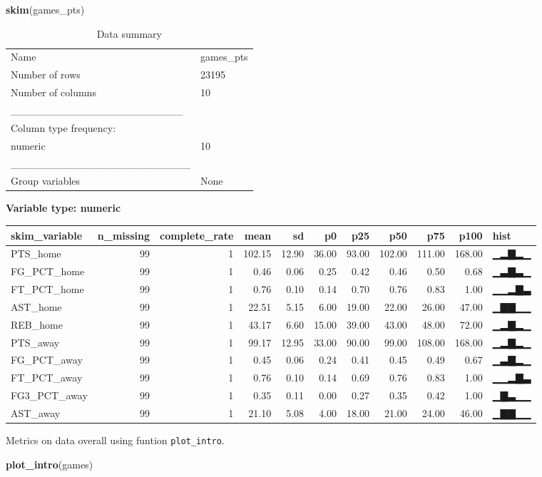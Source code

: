\documentclass[
]{article}
\newenvironment{Shaded}{\begin{snugshade}}{\end{snugshade}}
\newcommand{\KeywordTok}[1]{\textcolor[rgb]{0.13,0.29,0.53}{\textbf{#1}}}
\newcommand{\NormalTok}[1]{#1}
\begin{document}
\begin{Shaded}
\begin{Highlighting}[]
\KeywordTok{skim}\NormalTok{(games\_pts)}
\end{Highlighting}
\end{Shaded}

\begin{longtable}[]{@{}ll@{}}
\caption{Data summary}\tabularnewline
\toprule
\endhead
Name & games\_pts\tabularnewline
Number of rows & 23195\tabularnewline
Number of columns & 10\tabularnewline
\_\_\_\_\_\_\_\_\_\_\_\_\_\_\_\_\_\_\_\_\_\_\_ &\tabularnewline
Column type frequency: &\tabularnewline
numeric & 10\tabularnewline
\_\_\_\_\_\_\_\_\_\_\_\_\_\_\_\_\_\_\_\_\_\_\_\_ &\tabularnewline
Group variables & None\tabularnewline
\bottomrule
\end{longtable}

\textbf{Variable type: numeric}

\begin{longtable}[]{@{}lrrrrrrrrrl@{}}
\toprule
skim\_variable & n\_missing & complete\_rate & mean & sd & p0 & p25 &
p50 & p75 & p100 & hist\tabularnewline
\midrule
\endhead
PTS\_home & 99 & 1 & 102.15 & 12.90 & 36.00 & 93.00 & 102.00 & 111.00 &
168.00 & ▁▂▇▂▁\tabularnewline
FG\_PCT\_home & 99 & 1 & 0.46 & 0.06 & 0.25 & 0.42 & 0.46 & 0.50 & 0.68
& ▁▃▇▃▁\tabularnewline
FT\_PCT\_home & 99 & 1 & 0.76 & 0.10 & 0.14 & 0.70 & 0.76 & 0.83 & 1.00
& ▁▁▂▇▃\tabularnewline
AST\_home & 99 & 1 & 22.51 & 5.15 & 6.00 & 19.00 & 22.00 & 26.00 & 47.00
& ▁▇▇▁▁\tabularnewline
REB\_home & 99 & 1 & 43.17 & 6.60 & 15.00 & 39.00 & 43.00 & 48.00 &
72.00 & ▁▂▇▂▁\tabularnewline
PTS\_away & 99 & 1 & 99.17 & 12.95 & 33.00 & 90.00 & 99.00 & 108.00 &
168.00 & ▁▂▇▂▁\tabularnewline
FG\_PCT\_away & 99 & 1 & 0.45 & 0.06 & 0.24 & 0.41 & 0.45 & 0.49 & 0.67
& ▁▃▇▂▁\tabularnewline
FT\_PCT\_away & 99 & 1 & 0.76 & 0.10 & 0.14 & 0.69 & 0.76 & 0.83 & 1.00
& ▁▁▂▇▃\tabularnewline
FG3\_PCT\_away & 99 & 1 & 0.35 & 0.11 & 0.00 & 0.27 & 0.35 & 0.42 & 1.00
& ▁▇▃▁▁\tabularnewline
AST\_away & 99 & 1 & 21.10 & 5.08 & 4.00 & 18.00 & 21.00 & 24.00 & 46.00
& ▁▇▇▁▁\tabularnewline
\bottomrule
\end{longtable}

Metrics on data overall using funtion \texttt{plot\_intro}.

\begin{Shaded}
\begin{Highlighting}[]
\KeywordTok{plot\_intro}\NormalTok{(games)}
\end{Highlighting}
\end{Shaded}
\end{document}
